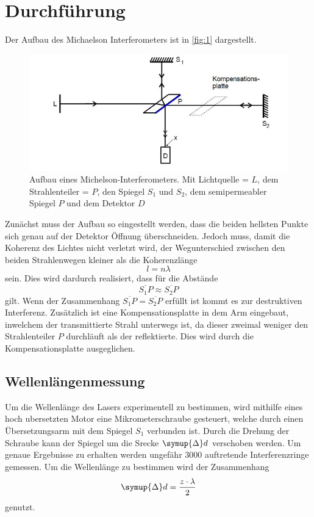 \newpage
\section{Durchführung}
Der Aufbau des Michaelson Interferometers ist in \autoref{fig:1} dargestellt. 

\begin{figure}
    \centering
    \includegraphics[scale = 0.7]{Picture/Pic1.JPG}
    \caption{Aufbau eines Michelson-Interferometers.
            Mit Lichtquelle = $L$, dem Strahlenteiler = $P$, den Spiegel $S_1$ und $S_2$, dem semipermeabler Spiegel $P$ und dem Detektor $D$}
    \label{fig:1}
  \end{figure}

Zunächst muss der Aufbau so eingestellt werden, dass die beiden hellsten Punkte sich genau auf der Detektor
Öffnung überschneiden. Jedoch muss, damit die Koherenz des Lichtes nicht verletzt wird, der Wegunterschied zwischen den beiden Strahlenwegen kleiner als die Koherenzlänge 
\begin{equation*}
    l = n \lambda
  \end{equation*}
\noindent
sein. Dies wird dardurch realisiert, dass für die Abstände 
\begin{equation*}
    \overline{S_1 P} \approx \overline{S_2 P}
    \label{eqn:close}
\end{equation*}
\noindent
gilt. Wenn der Zusammenhang $\overline{S_1 P} = \overline{S_2 P}$ erfüllt ist kommt es zur destruktiven Interferenz. Zusätzlich ist eine Kompensationsplatte in dem Arm eingebaut, 
inwelchem der transmittierte Strahl unterwegs ist, da dieser zweimal weniger den Strahlenteiler $P$ durchläuft als der reflektierte. Dies wird durch die Kompensationsplatte ausgeglichen.
\noindent


\subsection{Wellenlängenmessung}
Um die Wellenlänge des Lasers experimentell zu bestimmen, wird mithilfe eines hoch ubersetzten Motor eine Mikrometerschraube gesteuert, welche durch einen Übersetzungsarm mit dem 
Spiegel $S_1$ verbunden ist. Durch die Drehung der Schraube kann der Spiegel um die Srecke $\symup{\Delta} d$ verschoben werden. Um genaue Ergebnisse zu erhalten werden ungefähr 
3000 auftretende Interferenzringe gemessen. 
Um die Wellenlänge zu bestimmen wird der Zusammenhang
\begin{equation*}
    \symup{\Delta}d = \frac{z \cdot \lambda}{2}
    \label{eqn:d2}
\end{equation*}
\noindent
genutzt. 

